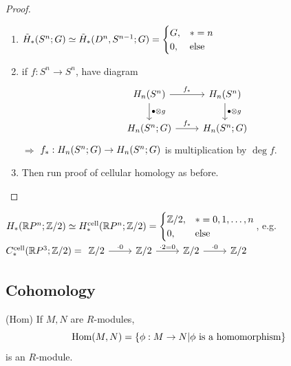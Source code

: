 \documentclass[a4paper,11pt]{article}
\begin{document}
\begin{proof}
					\begin{enumerate}
						\item $\rhg{S^n;G}\simeq\rhg{D^n,S^{n-1};G}=\begin{cases}
							G,&\ast=n\\0,&\text{else}
						\end{cases}$
						\item if $f:S^n\rightarrow S^n$, have diagram
							\begin{equation*}
								\begin{tikzcd}
									\hg[n]{S^n}\ar[r,"f_\ast"]\ar[d,"\bullet\otimes g"]& \hg[n]{S^n}\ar[d,"\bullet\otimes g"]\\
									\hg[n]{S^n;G}\ar[r,"f_\ast"]& \hg[n]{S^n;G}
								\end{tikzcd}
							\end{equation*}
							$\Longrightarrow$ $f_\ast:\hg[n]{S^n;G}\rightarrow \hg[n]{S^n;G}$ is multiplication by $\deg f$.
						\item Then run proof of cellular homology as before.
					\end{enumerate}
				\end{proof}

				\begin{eg}
					$\hg{\R P^n;\Z/2}\simeq H_\ast^\text{cell}(\R P^n;\Z/2)=\begin{cases}
						\Z/2,&\ast=0,1,\dots,n\\0,&\text{else}
					\end{cases}$, e.g.\\ $C_\ast^\text{cell}(\R P^3;\Z/2)=\begin{tikzcd}
						\Z/2\ar[r,"\cdot 0"]& \Z/2\ar[r,"\cdot 2=0"]& \Z/2\ar[r,"\cdot 0"]& \Z/2
					\end{tikzcd}$
				\end{eg}
				

		\subsection{Cohomology}
			
			\begin{defi}
				(Hom) If $M,N$ are $R$-modules, 
				\begin{equation*}
					\Hom(M,N)=\{\phi:M\rightarrow N|\phi\text{ is a homomorphism}\}
				\end{equation*} 
				is an $R$-module.
			\end{defi}
			
\end{document}
